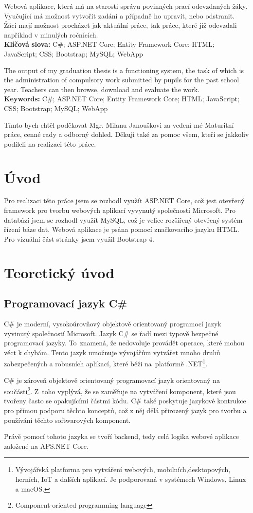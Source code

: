 \documentclass[a4paper, 12pt]{report}
\begin{document}
	\titulniStrana
	
	\anotace Webová aplikace, která má na starosti správu povinných prací odevzdaných žáky. Vyučující má možnost vytvořit zadání a případně ho upravit, nebo odstranit. Žáci mají možnost procházet jak aktuální práce, tak práce, které již odevzdali například v minulých ročnících. \\
	\textbf{Klíčová slova: } C\#; ASP.NET Core; Entity Framework Core; HTML; JavaScript; CSS; Bootstrap; MySQL; WebApp

	\annotation The output of my graduation thesis is a functioning system, the task of which is the administration of compulsory work submitted by pupils for the past school year. Teachers can then browse, download and evaluate the work.\\
	\textbf{Keywords: } C\#; ASP.NET Core; Entity Framework Core; HTML; JavaScript; CSS; Bootstrap; MySQL; WebApp

	\podekovani Tímto bych chtěl poděkovat Mgr. Milanu Janouškovi za vedení mé Maturitní práce, cenné rady a odborný dohled. Děkuji také za pomoc všem, kteří se jakkoliv podíleli na realizaci této práce.
	
	\obsah

	\chapter{Úvod}
    Pro realizaci této práce jsem se rozhodl využít ASP.NET Core, což jest otevřený framework pro tvorbu webových aplikací vyvynutý společností Microsoft. Pro databázi jsem se rozhodl využít MySQL, což je velice rozšířený otevřený systém řízení báze dat. Webová aplikace je psána pomocí značkovacího jazyku HTML. Pro vizuální část stránky jsem využil Bootstrap 4.
	\chapter{Teoretický úvod}
		\section{Programovací jazyk C\#}
        C\# je moderní, vysokoúrovňový objektově orientovaný programocí jazyk vyvinutý společností Microsoft. Jazyk C\# se řadí mezi typově bezpečné programovací jazyky. To~znamená, že nedovoluje provádět operace, které mohou véct k chybám. Tento jazyk umožnuje vývojářům vytvářet mnoho druhů zabezpečených a robusních aplikací, které běži na~platformě .NET\footnote{Vývojářská platforma pro vytváření webových, mobilních,desktopových, herních, IoT a dalších aplikací. Je podporovaná v systémech Windows, Linux a macOS.}.\par
        C\# je zároveň objektově orientovaný programovací jazyk orientovaný na součásti\footnote{Component-oriented programming language}. Z~toho vyplývá, že se zaměřuje na vytváření komponent, které jsou tvořeny často se opakujícími částmi kódu. C\# také poskytuje jazykové kontrukce pro přímou podporu těchto konceptů, což z něj dělá přirozený jazyk pro tvorbu a používání těchto softwarových komponent.\cite{CSharp}\par
		Právě pomocí tohoto jazyka se tvoří backend, tedy celá logika webové aplikace založené na APS.NET Core.
\end{document}
